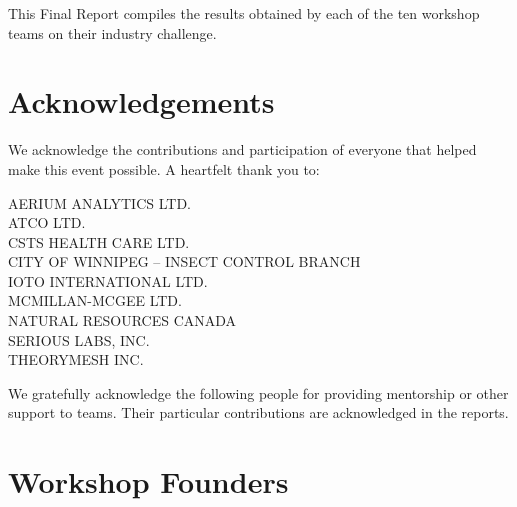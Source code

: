 \documentclass[11pt]{report}
\begin{document}
This  Final Report compiles the results obtained by each of the ten
workshop teams on their industry challenge.   


\newpage

\section*{Acknowledgements}
We acknowledge the contributions and participation of everyone that helped make
this event possible.  A heartfelt thank you to: 


\noindent\hrulefill

\begin{multicols}{2}
    \begin{flushleft}
        \uppercase{Aerium Analytics Ltd.} \\
        \uppercase{ATCO Ltd.} \\
        \uppercase{CSTS Health Care Ltd.} \\
        \uppercase{City of Winnipeg -- Insect Control Branch} \\
        \uppercase{IOTO International Ltd.} \\
        \uppercase{McMillan-McGee Ltd.} \\
        \uppercase{Natural Resources Canada} \\
        \uppercase{Serious Labs, Inc.} \\
        \uppercase{TheoryMesh Inc.}
    \end{flushleft}
 \end{multicols}

\noindent\hrulefill

We gratefully acknowledge the following people for providing mentorship or
other support to \mtopi teams. Their particular contributions are acknowledged
in the reports.

\noindent\hrulefill

\section*{Workshop Founders}
\begin{multicols}{2}
    \begin{flushleft} 
         \\
    \end{flushleft}
\end{multicols}
\end{document}
